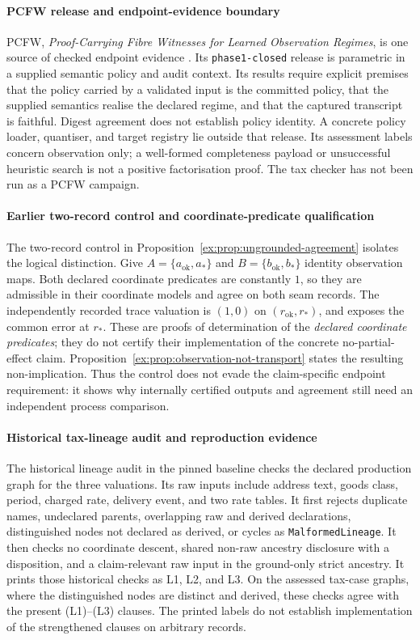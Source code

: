 \documentclass[11pt]{article}
\theoremstyle{definition}
\newcommand{\code}[1]{\texttt{#1}}
\begin{document}
\paragraph{PCFW release and endpoint-evidence boundary}
PCFW, \emph{Proof-Carrying Fibre Witnesses for Learned Observation Regimes}, is one source of checked endpoint evidence \citep{moore2026pcfw}. Its \code{phase1-closed} release is parametric in a supplied semantic policy and audit context. Its results require explicit premises that the policy carried by a validated input is the committed policy, that the supplied semantics realise the declared regime, and that the captured transcript is faithful. Digest agreement does not establish policy identity. A concrete policy loader, quantiser, and target registry lie outside that release. Its assessment labels concern observation only; a well-formed completeness payload or unsuccessful heuristic search is not a positive factorisation proof. The tax checker has not been run as a PCFW campaign.


\paragraph{Earlier two-record control and coordinate-predicate qualification}
The two-record control in Proposition~\ref{ex:prop:ungrounded-agreement} isolates the logical distinction. Give $A=\{a_{\mathrm{ok}},a_*\}$ and $B=\{b_{\mathrm{ok}},b_*\}$ identity observation maps. Both declared coordinate predicates are constantly $1$, so they are admissible in their coordinate models and agree on both seam records. The independently recorded trace valuation is $(1,0)$ on $(r_{\mathrm{ok}},r_*)$, and exposes the common error at $r_*$. These are proofs of determination of the \emph{declared coordinate predicates}; they do not certify their implementation of the concrete no-partial-effect claim. Proposition~\ref{ex:prop:observation-not-transport} states the resulting non-implication. Thus the control does not evade the claim-specific endpoint requirement: it shows why internally certified outputs and agreement still need an independent process comparison.


\paragraph{Historical tax-lineage audit and reproduction evidence}
The historical lineage audit in the pinned baseline checks the declared production graph for the three valuations. Its raw inputs include address text, goods class, period, charged rate, delivery event, and two rate tables. It first rejects duplicate names, undeclared parents, overlapping raw and derived declarations, distinguished nodes not declared as derived, or cycles as \code{MalformedLineage}. It then checks no coordinate descent, shared non-raw ancestry disclosure with a disposition, and a claim-relevant raw input in the ground-only strict ancestry. It prints those historical checks as L1, L2, and L3. On the assessed tax-case graphs, where the distinguished nodes are distinct and derived, these checks agree with the present (L1)--(L3) clauses. The printed labels do not establish implementation of the strengthened clauses on arbitrary records.
\end{document}
